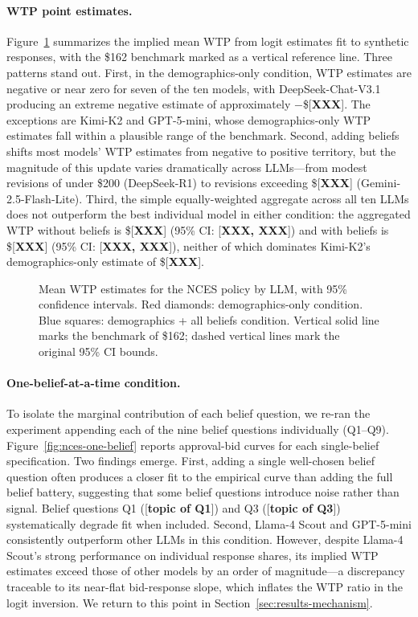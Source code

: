 \documentclass[12pt]{article}
\begin{document}
\paragraph{WTP point estimates.} Figure~\ref{fig:nces-wtp} summarizes the implied mean WTP from logit estimates fit to synthetic responses, with the \$162 benchmark marked as a vertical reference line. Three patterns stand out. First, in the demographics-only condition, WTP estimates are negative or near zero for seven of the ten models, with DeepSeek-Chat-V3.1 producing an extreme negative estimate of approximately $-$\$[\textbf{XXX}]. The exceptions are Kimi-K2 and GPT-5-mini, whose demographics-only WTP estimates fall within a plausible range of the benchmark. Second, adding beliefs shifts most models' WTP estimates from negative to positive territory, but the magnitude of this update varies dramatically across LLMs---from modest revisions of under \$200 (DeepSeek-R1) to revisions exceeding \$[\textbf{XXX}] (Gemini-2.5-Flash-Lite). Third, the simple equally-weighted aggregate across all ten LLMs does not outperform the best individual model in either condition: the aggregated WTP without beliefs is \$[\textbf{XXX}] (95\% CI: [\textbf{XXX, XXX}]) and with beliefs is \$[\textbf{XXX}] (95\% CI: [\textbf{XXX, XXX}]), neither of which dominates Kimi-K2's demographics-only estimate of \$[\textbf{XXX}].

\begin{figure}[h]
    \centering
    \caption{Mean WTP estimates for the NCES policy by LLM, with 95\% confidence intervals. Red diamonds: demographics-only condition. Blue squares: demographics + all beliefs condition. Vertical solid line marks the \textcite{Aldy2012} benchmark of \$162; dashed vertical lines mark the original 95\% CI bounds.}
    \label{fig:nces-wtp}
\end{figure}

\paragraph{One-belief-at-a-time condition.} To isolate the marginal contribution of each belief question, we re-ran the experiment appending each of the nine belief questions individually (Q1--Q9). Figure~\ref{fig:nces-one-belief} reports approval-bid curves for each single-belief specification. Two findings emerge. First, adding a single well-chosen belief question often produces a closer fit to the empirical curve than adding the full belief battery, suggesting that some belief questions introduce noise rather than signal. Belief questions Q1 ([\textbf{topic of Q1}]) and Q3 ([\textbf{topic of Q3}]) systematically degrade fit when included. Second, Llama-4 Scout and GPT-5-mini consistently outperform other LLMs in this condition. However, despite Llama-4 Scout's strong performance on individual response shares, its implied WTP estimates exceed those of other models by an order of magnitude---a discrepancy traceable to its near-flat bid-response slope, which inflates the WTP ratio in the logit inversion. We return to this point in Section~\ref{sec:results-mechanism}.
\end{document}
